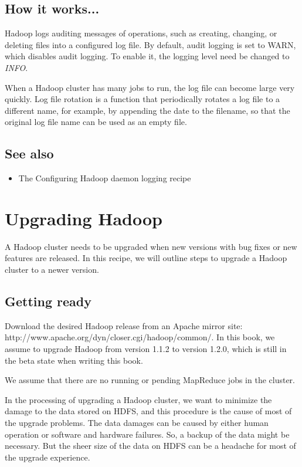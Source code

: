 \subsection*{How it works...}
Hadoop logs auditing messages of operations, such as creating, changing, or deleting files into a configured log file. By default, audit logging is set to WARN, which disables audit logging. To enable it, the logging level need be changed to \emph{INFO}.

When a Hadoop cluster has many jobs to run, the log file can become large very quickly. Log file rotation is a function that periodically rotates a log file to a different name, for example, by appending the date to the filename, so that the original log file name can be used as an empty file.
\subsection*{See also}
\begin{itemize}
  \item The Configuring Hadoop daemon logging recipe
\end{itemize}

\section{Upgrading Hadoop}
A Hadoop cluster needs to be upgraded when new versions with bug fixes or new features are released. In this recipe, we will outline steps to upgrade a Hadoop cluster to a newer version.

\subsection*{Getting ready}
Download the desired Hadoop release from an Apache mirror site: http://www.apache.org/dyn/closer.cgi/hadoop/common/. In this book, we assume to upgrade Hadoop from version 1.1.2 to version 1.2.0, which is still in the beta state when writing this book.

We assume that there are no running or pending MapReduce jobs in the cluster.

In the processing of upgrading a Hadoop cluster, we want to minimize the damage to the data stored on HDFS, and this procedure is the cause of most of the upgrade problems. The data damages can be caused by either human operation or software and hardware failures. So, a backup of the data might be necessary. But the sheer size of the data on HDFS can be a headache for most of the upgrade experience.

